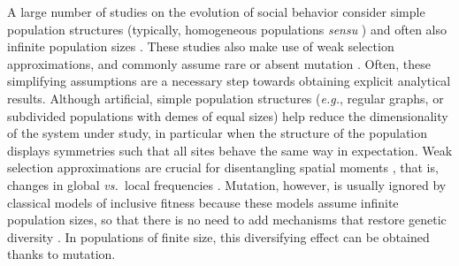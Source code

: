 \documentclass[11pt, letterpaper]{article}
\newcommand{\eg}{\textit{e.g.}}
\newcommand{\vs}{\textit{vs.\ }}
\begin{document}
A large number of studies on the evolution of social behavior consider simple population structures (typically, homogeneous populations \textit{sensu} \citet[][]{TaylorDayWild2007}) and often also infinite population sizes \citep[but see][for results on any structure]{Allen2017}. 
These studies also make use of weak selection approximations, and commonly assume rare \citep[\eg,][]{LeturqueRousset2002, Taylor2007JTB, TarnitaTaylor2014} or absent mutation \citep[for models assuming infinite population sizes, or models concentrating on fixation probabilities; see][for recent reviews]{LehmannRousset2014,VanCleve2015}. 
Often, these simplifying assumptions are a necessary step towards obtaining explicit analytical results. 
Although artificial, simple population structures (\eg, regular graphs, or subdivided populations with demes of equal sizes) help reduce the dimensionality of the system under study, in particular when the structure of the population displays symmetries such that all sites behave the same way in expectation. 
Weak selection approximations are crucial for disentangling spatial moments \citep{Lion2016}, that is, changes in global \vs local frequencies \citep[though they can in some cases be relaxed, as in][]{MullonLehmann2014}. 
Mutation, however, is usually ignored by classical models of inclusive fitness because these models assume infinite population sizes, so that there is no need to add mechanisms that restore genetic diversity \citep{TarnitaTaylor2014}. In populations of finite size,  this diversifying effect can be obtained thanks to mutation. %
\end{document}
